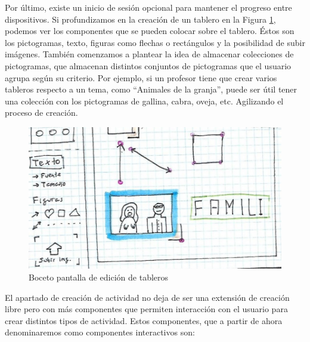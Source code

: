 Por último, existe un inicio de sesión opcional para mantener el progreso entre dispositivos. Si profundizamos en la creación de un tablero en la Figura \ref{fig:dibujolibrealfon}, podemos ver los componentes que se pueden colocar sobre el tablero. Éstos son los pictogramas, texto, figuras como flechas o rectángulos y la posibilidad de subir imágenes. También comenzamos a plantear la idea de almacenar colecciones de pictogramas, que almacenan distintos conjuntos de pictogramas que el usuario agrupa según su criterio. Por ejemplo, si un profesor tiene que crear varios tableros respecto a un tema, como “Animales de la granja”, puede ser útil tener una colección con los pictogramas de gallina, cabra, oveja, etc. Agilizando el proceso de creación.

\begin{figure}[h!]
	\centering
	\includegraphics[width=0.7\linewidth]{Imagenes/Bitmap/DibujoLibreAlfon}
	\caption{Boceto pantalla de edición de tableros }
	\label{fig:dibujolibrealfon}
\end{figure}

El apartado de  creación de actividad no deja de ser una extensión de creación libre pero con más  componentes que permiten interacción con el usuario para crear distintos tipos de actividad. Estos componentes, que a partir de ahora denominaremos como componentes interactivos son:

